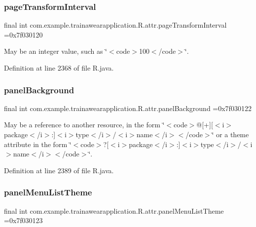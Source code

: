 \subsubsection{\texorpdfstring{pageTransformInterval}{pageTransformInterval}}
{\footnotesize\ttfamily final int com.\+example.\+trainawearapplication.\+R.\+attr.\+page\+Transform\+Interval =0x7f030120\hspace{0.3cm}{\ttfamily [static]}}

May be an integer value, such as \char`\"{}$<$code$>$100$<$/code$>$\char`\"{}. 

Definition at line 2368 of file R.\+java.

\mbox{\label{classcom_1_1example_1_1trainawearapplication_1_1_r_1_1attr_aaae8a6bbc8b3121f61ad6ce030145277}} 
\subsubsection{\texorpdfstring{panelBackground}{panelBackground}}
{\footnotesize\ttfamily final int com.\+example.\+trainawearapplication.\+R.\+attr.\+panel\+Background =0x7f030122\hspace{0.3cm}{\ttfamily [static]}}

May be a reference to another resource, in the form \char`\"{}$<$code$>$@\mbox{[}+\mbox{]}\mbox{[}$<$i$>$package$<$/i$>$\+:\mbox{]}$<$i$>$type$<$/i$>$/$<$i$>$name$<$/i$>$$<$/code$>$\char`\"{} or a theme attribute in the form \char`\"{}$<$code$>$?\mbox{[}$<$i$>$package$<$/i$>$\+:\mbox{]}$<$i$>$type$<$/i$>$/$<$i$>$name$<$/i$>$$<$/code$>$\char`\"{}. 

Definition at line 2389 of file R.\+java.

\mbox{\label{classcom_1_1example_1_1trainawearapplication_1_1_r_1_1attr_a0f862ab76b3c7ab674b5c0e6169268fb}} 
\subsubsection{\texorpdfstring{panelMenuListTheme}{panelMenuListTheme}}
{\footnotesize\ttfamily final int com.\+example.\+trainawearapplication.\+R.\+attr.\+panel\+Menu\+List\+Theme =0x7f030123\hspace{0.3cm}{\ttfamily [static]}}

